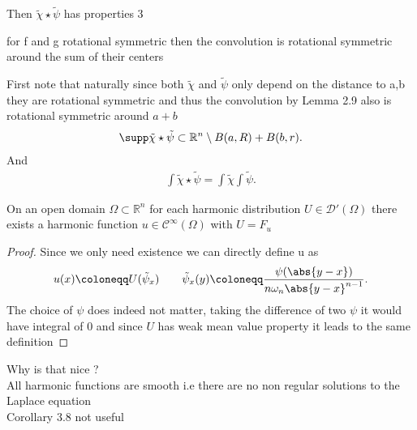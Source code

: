 Then $\tilde{\chi } \star  \tilde{\psi}  $ has properties 3
\begin{lemma}[2.9]
  for f and g rotational symmetric  then the convolution is rotational symmetric around  the sum of their centers
\end{lemma}
First note that naturally since both $\tilde{\chi } $ and $\tilde{\psi} $ only depend on the distance to a,b they are 
rotational symmetric and thus the convolution by Lemma 2.9 also is rotational symmetric around $a+b$
\begin{align*}
  \supp  \tilde{\chi } \star  \tilde{\psi} \subset  \mathbb{R}^{n}  \setminus B(a,R) + B(b,r)
.\end{align*}
And 
\begin{align*}
  \int \tilde{\chi } \star \tilde{\psi} = \int \tilde{\chi }  \int \tilde{\psi} 
.\end{align*}
\begin{lemma}
 On an open domain $\Omega \subset  \mathbb{R}^{n} $  for each harmonic distribution $U \in  \mathcal{D}'(\Omega )$ there exists a 
 harmonic function $u \in  \mathcal{C}^{\infty}(\Omega ) $ with $U = F_u$
\end{lemma}
\begin{proof}
 Since we only need existence we can directly define u as 
 \begin{align*}
   u(x) \coloneqq  U(\tilde{\psi}_x) \qquad \tilde{\psi}_x (y) \coloneqq  \frac{\psi(\abs{y-x})}{n \omega_n \abs{y-x}^{n-1} }
 .\end{align*}
 The choice of $\psi$ does indeed not matter, taking the difference of two $\psi$ it would have integral of 0 
 and since $U$ has weak mean value property it leads to the same definition
\end{proof}
Why is that nice ? \\[1ex]
All harmonic functions are smooth i.e there are no non regular solutions to the Laplace equation \\[1ex]
Corollary 3.8 not useful
